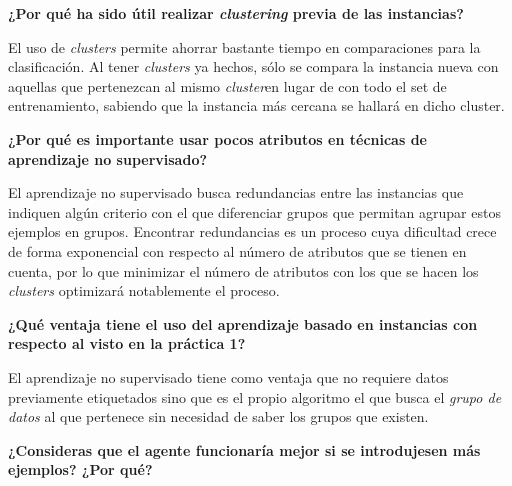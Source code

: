 \documentclass[12pt]{article}
\begin{document}
\newpage

\vspace{0.5cm}
\begin{center}
    \textbf{¿Por qué ha sido útil realizar \emph{clustering} previa de las instancias?}
\end{center}
\vspace{0.5cm}


El uso de \emph{clusters} permite ahorrar bastante tiempo en comparaciones para la clasificación. Al tener \emph{clusters} ya hechos, sólo se compara la instancia nueva con aquellas que pertenezcan al mismo \emph{cluster}en lugar de con todo el set de entrenamiento, sabiendo que la instancia más cercana se hallará en dicho cluster.

\vspace{0.5cm}
\begin{center}
    \textbf{¿Por qué es importante usar pocos atributos en técnicas de aprendizaje no supervisado?}
\end{center}
\vspace{0.5cm}

El aprendizaje no supervisado busca redundancias entre las instancias que indiquen algún criterio con el que diferenciar grupos que permitan agrupar estos ejemplos en grupos. Encontrar redundancias es un proceso cuya dificultad crece de forma exponencial con respecto al número de atributos que se tienen en cuenta, por lo que minimizar el número de atributos con los que se hacen los \emph{clusters} optimizará notablemente el proceso.

\vspace{0.5cm}
\begin{center}
    \textbf{¿Qué ventaja tiene el uso del aprendizaje basado en instancias con respecto al visto en la práctica 1?}
\end{center}
\vspace{0.5cm}

El aprendizaje no supervisado tiene como ventaja que no requiere datos previamente etiquetados sino que es el propio algoritmo el que busca el \emph{grupo de datos} al que pertenece sin necesidad de saber los grupos que existen.

\vspace{0.5cm}
\begin{center}
    \textbf{¿Consideras que el agente funcionaría mejor si se introdujesen más ejemplos? ¿Por qué?}
\end{center}
\vspace{0.5cm}
\end{document}
